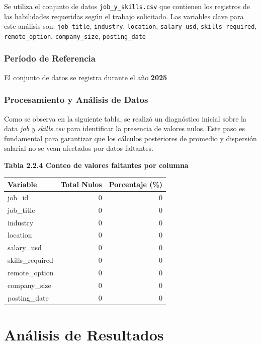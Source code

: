 \documentclass[oneside,11pt]{Latex/Classes/PhDthesisPSnPDF}
\begin{document}
Se utiliza el conjunto de datos \texttt{job\_y\_skills.csv} que
contienen los registros de las habilidades requeridas según el trabajo
solicitado. Las variables clave para este análisis son:
\texttt{job\_title}, \texttt{industry}, \texttt{location},
\texttt{salary\_usd}, \texttt{skills\_required},
\texttt{remote\_option}, \texttt{company\_size}, \texttt{posting\_date}

\subsection{Período de Referencia}

El conjunto de datos se registra durante el año \textbf{2025}

\subsection{Procesamiento y Análisis de Datos}

Como se observa en la siguiente tabla, se realizó un diagnóstico inicial
sobre la data \emph{job y skills.csv} para identificar la presencia de
valores nulos. Este paso es fundamental para garantizar que los cálculos
posteriores de promedio y dispersión salarial no se vean afectados por
datos faltantes.

\begin{center}
\textbf{Tabla 2.2.4 Conteo de valores faltantes por columna}
\end{center}

\begin{longtable}[]{@{}lrr@{}}
\toprule\noalign{}
Variable & Total Nulos & Porcentaje (\%) \\
\midrule\noalign{}
\endhead
\bottomrule\noalign{}
\endlastfoot
job\_id & 0 & 0 \\
job\_title & 0 & 0 \\
industry & 0 & 0 \\
location & 0 & 0 \\
salary\_usd & 0 & 0 \\
skills\_required & 0 & 0 \\
remote\_option & 0 & 0 \\
company\_size & 0 & 0 \\
posting\_date & 0 & 0 \\
\end{longtable}

\chapter{Análisis de Resultados}
\end{document}
